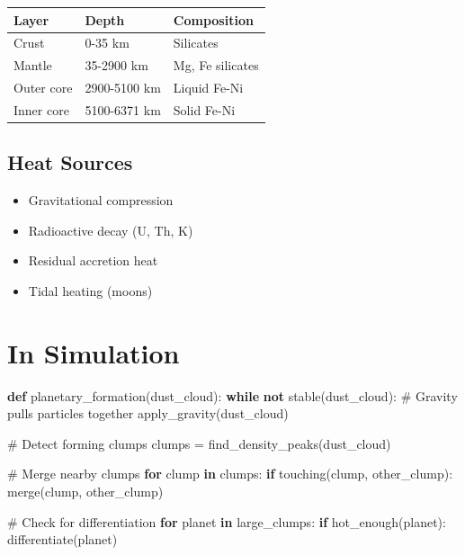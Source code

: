 \documentclass[
  11pt,
  letterpaper,
  twoside,
  openright]{book}
\newenvironment{Shaded}{\begin{snugshade}}{\end{snugshade}}
\newcommand{\CommentTok}[1]{\textcolor[rgb]{0.37,0.37,0.37}{#1}}
\newcommand{\ControlFlowTok}[1]{\textcolor[rgb]{0.00,0.23,0.31}{\textbf{#1}}}
\newcommand{\KeywordTok}[1]{\textcolor[rgb]{0.00,0.23,0.31}{\textbf{#1}}}
\newcommand{\NormalTok}[1]{\textcolor[rgb]{0.00,0.23,0.31}{#1}}
\newcommand{\OperatorTok}[1]{\textcolor[rgb]{0.37,0.37,0.37}{#1}}
\providecommand{\tightlist}{%
  \setlength{\itemsep}{0pt}\setlength{\parskip}{0pt}}
\begin{document}
\begin{longtable}[]{@{}lll@{}}
\toprule\noalign{}
Layer & Depth & Composition \\
\midrule\noalign{}
\endhead
\bottomrule\noalign{}
\endlastfoot
Crust & 0-35 km & Silicates \\
Mantle & 35-2900 km & Mg, Fe silicates \\
Outer core & 2900-5100 km & Liquid Fe-Ni \\
Inner core & 5100-6371 km & Solid Fe-Ni \\
\end{longtable}

\subsection{Heat Sources}\label{heat-sources}

\begin{itemize}
\tightlist
\item
  Gravitational compression
\item
  Radioactive decay (U, Th, K)
\item
  Residual accretion heat
\item
  Tidal heating (moons)
\end{itemize}

\section{In Simulation}\label{in-simulation-7}

\begin{Shaded}
\begin{Highlighting}[]
\KeywordTok{def}\NormalTok{ planetary\_formation(dust\_cloud):}
    \ControlFlowTok{while} \KeywordTok{not}\NormalTok{ stable(dust\_cloud):}
        \CommentTok{\# Gravity pulls particles together}
\NormalTok{        apply\_gravity(dust\_cloud)}

        \CommentTok{\# Detect forming clumps}
\NormalTok{        clumps }\OperatorTok{=}\NormalTok{ find\_density\_peaks(dust\_cloud)}

        \CommentTok{\# Merge nearby clumps}
        \ControlFlowTok{for}\NormalTok{ clump }\KeywordTok{in}\NormalTok{ clumps:}
            \ControlFlowTok{if}\NormalTok{ touching(clump, other\_clump):}
\NormalTok{                merge(clump, other\_clump)}

        \CommentTok{\# Check for differentiation}
        \ControlFlowTok{for}\NormalTok{ planet }\KeywordTok{in}\NormalTok{ large\_clumps:}
            \ControlFlowTok{if}\NormalTok{ hot\_enough(planet):}
\NormalTok{                differentiate(planet)}
\end{Highlighting}
\end{Shaded}
\end{document}
